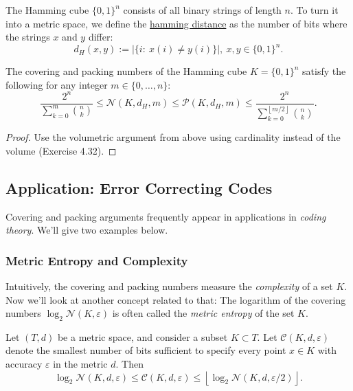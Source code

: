 \begin{definition}[]
\label{def:4.2.14} 
The Hamming cube $\{0, 1\}^n$ consists of all binary strings of length $n$. To turn it into a metric space, 
we define the \underline{hamming distance} as the number of bits where the strings $x$ and $y$ differ:
\[ d_H(x, y) := |\{i: \ x(i) \neq y(i) \}|, \ x, y \in \{0, 1\}^n. \]
\end{definition}

\begin{proposition}
\label{prop:4.2.15}
The covering and packing numbers of the Hamming cube $K = \{0, 1\}^n$ satisfy the following for any integer 
$m \in \{0, \dots, n\}$: 
\[ \frac{2^n}{\sum_{k = 0}^{m} \binom{n}{k}} \leq \mathcal{N}(K, d_H, m) 
\leq \mathcal{P}(K, d_H, m) \leq \frac{2^n}{\sum_{k = 0}^{\left\lfloor m/2 \right\rfloor} \binom{n}{k}}. \]
\end{proposition}

\begin{proof}
Use the volumetric argument from above using cardinality instead of the volume (Exercise 4.32).
\end{proof}



\subsection{Application: Error Correcting Codes}
Covering and packing arguments frequently appear in applications in \textit{coding theory}. We'll give two 
examples below.


\subsubsection{Metric Entropy and Complexity}
Intuitively, the covering and packing numbers measure the \textit{complexity} of a set $K$. Now we'll look at 
another concept related to that: The logarithm of the covering numbers $\log_{2}{\mathcal{N}(K, \varepsilon)}$ 
is often called the \textit{metric entropy} of the set $K$. 

\begin{proposition}
\label{prop:4.3.1}
Let $(T, d)$ be a metric space, and consider a subset $K \subset T$. Let $\mathcal{C}(K, d, \varepsilon)$ denote 
the smallest number of bits sufficient to specify every point $x \in K$ with accuracy $\varepsilon$ in the 
metric $d$. Then 
\[ \log_{2}{\mathcal{N}(K, d, \varepsilon)} \leq \mathcal{C}(K, d, \varepsilon) 
\leq \left\lfloor \log_{2}{\mathcal{N}(K, d, \varepsilon/2)} \right\rfloor. \]
\end{proposition}

